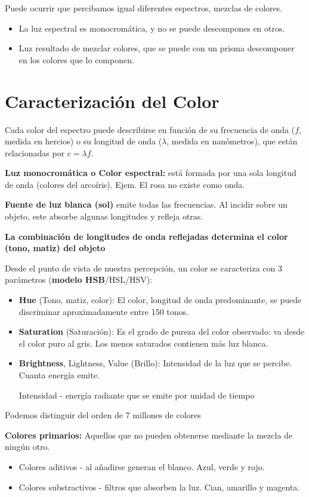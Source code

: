 Puede ocurrir que percibamos igual diferentes espectros, mezclas de colores.
\begin{itemize}
    \item La luz espectral es monocromática, y no se puede descompones en otros.
    \item Luz resultado de mezclar colores, que se puede con un prisma descomponer en los colores que lo componen.
\end{itemize}

\section{Caracterización del Color}
Cada color del espectro puede describirse en función de su frecuencia de onda ($f$, medida en hercios) o su longitud de onda ($\lambda$, medida en nanómetros), que están relacionadas por $c = \lambda f$.

\textbf{Luz monocromática o Color espectral:} está formada por una sola longitud de onda (colores del arcoíris). Ejem. El rosa no existe como onda.

\textbf{Fuente de luz blanca (sol)} emite todas las frecuencias. Al incidir sobre un objeto, este absorbe algunas longitudes y refleja otras. 

\textbf{La combinación de longitudes de onda reflejadas determina el color (tono, matiz) del objeto}

Desde el punto de vista de nuestra percepción, un color se caracteriza con 3 parámetros (\textbf{modelo HSB}/HSL/HSV):
\begin{itemize}
    \item \textbf{Hue} (Tono, matiz, color): El color, longitud de onda predominante, se puede discriminar aproximadamente entre 150 tonos.
    \item \textbf{Saturation} (Saturación): Es el grado de pureza del color observado: va desde el color puro al gris. Los menos saturados contienen más luz blanca.
    \item \textbf{Brightness}, Lightness, Value (Brillo): Intensidad de la luz que se percibe. Cuanta energía emite.
    
    Intensidad - energía radiante que se emite por unidad de tiempo
\end{itemize}

Podemos distinguir del orden de 7 millones de colores

\textbf{Colores primarios:} Aquellos que no pueden obtenerse mediante la mezcla de ningún otro.
\begin{itemize}
    \item Colores aditivos - al añadirse generan el blanco. Azul, verde y rojo.
    \item Colores substractivos - filtros que absorben la luz. Cian, amarillo y magenta.
\end{itemize}

